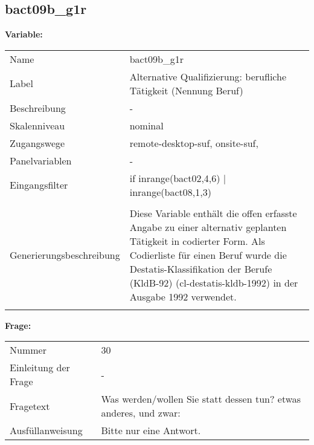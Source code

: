 	
	
	\subsection{bact09b\_g1r}
	\label{subSection:bact09b_g1r}

	\noindent\textbf{Variable:}\\
		\begin{tabular}{lL{11.3cm}}
			\label{tableVariable:bact09b_g1r}
			Name & bact09b\_g1r \\
			Label & Alternative Qualifizierung: berufliche Tätigkeit (Nennung Beruf) \\
			Beschreibung & - \\
			Skalenniveau & nominal \\
			Zugangswege &
				remote-desktop-suf,
				onsite-suf,
 \\
			Panelvariablen & -
			 \\
			Eingangsfilter & if inrange(bact02,4,6) | inrange(bact08,1,3) \\
 \\
					Generierungsbeschreibung & Diese Variable enthält die offen erfasste Angabe zu einer alternativ geplanten Tätigkeit in codierter Form. Als Codierliste für einen Beruf wurde die Destatis-Klassifikation der Berufe (KldB-92) (cl-destatis-kldb-1992) in der Ausgabe 1992 verwendet. 
				 \\	
			 \\
		\end{tabular}

		\vspace*{1 cm}
		\noindent\textbf{Frage:}\\
		\begin{tabular}{lL{11.3cm}}
			\label{tableQuestion:bact09b_g1r}
			Nummer & 30 \\
			Einleitung der Frage & - \\
			Fragetext & Was werden/wollen Sie statt dessen tun?
etwas anderes, und zwar: \\
			Ausfüllanweisung & Bitte nur eine Antwort. \\
		\end{tabular}





